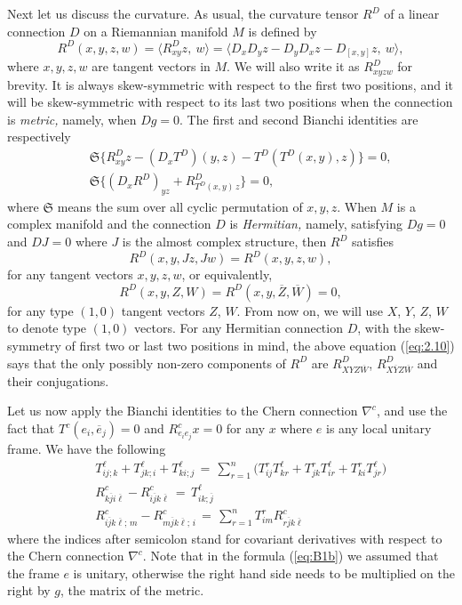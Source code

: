 \documentclass{amsart}
\numberwithin{equation}{section}
\theoremstyle{definition}
\renewcommand{\1}{\mathds{1}}
\renewcommand{\>}{\rightarrow}
\begin{document}
Next let us discuss the curvature. As usual, the curvature tensor $R^D$ of a linear connection $D$ on a Riemannian manifold $M$ is defined  by
$$ R^D(x,y,z,w) = \langle R^D_{xy}z, \ w \rangle = \langle D_xD_yz-D_yD_xz - D_{[x,y]}z, \ w \rangle, $$
where $x,y,z,w$ are tangent vectors in $M$. We will also write it as $R^D_{xyzw}$ for brevity. It is always skew-symmetric with respect to the first two positions, and it will be skew-symmetric with respect to its last two positions when the connection is {\em metric,}  namely, when $Dg=0$.  The first and second Bianchi identities are respectively
\begin{eqnarray*}
&& {\mathfrak S}\{ R^D_{xy}z - (D_xT^D)(y,z) - T^D(T^D(x,y),z)  \} = 0,   \label{eq:B1} \\
&& {\mathfrak S}\{ (D_xR^D)_{yz} + R^D_{T^D(x,y)\, z} \} = 0,  \label{eq:B2}
\end{eqnarray*}
where ${\mathfrak S}$ means the sum over all cyclic permutation of $x,y,z$. When $M$ is a complex manifold and the connection $D$ is {\em Hermitian,} namely, satisfying $Dg=0$ and $DJ=0$ where $J$ is the almost complex structure, then $R^D$ satisfies
$$ R^D(x,y,Jz,Jw) = R^D(x,y,z,w), $$
for any tangent vectors $x,y,z,w$, or equivalently,
\begin{equation}
 R^D(x,y,Z,W) = R^D(x,y,\overline{Z},\overline{W}) =0 , \label{eq:2.10}
 \end{equation}
for any type $(1,0)$ tangent vectors $Z$, $W$. From now on, we will use $X$, $Y$, $Z$, $W$ to denote type $(1,0)$ vectors. For any Hermitian connection $D$, with the skew-symmetry of first two or last two positions in mind, the above equation (\ref{eq:2.10}) says that the only possibly non-zero components of $R^D$ are $R^D_{XYZ\overline{W}}$, $R^D_{X\overline{Y}Z\overline{W}}$ and their conjugations.

Let us now apply the Bianchi identities to the Chern connection $\nabla^c$, and use the fact that $T^c(e_i, \overline{e}_j)=0$ and $R^c_{e_ie_j}x =0$ for any $x$ where $e$ is any local unitary frame. We have the following
\begin{eqnarray}
&&  T^{\ell}_{ij;k} + T^{\ell}_{jk;i}+ T^{\ell}_{ki;j}\, = \,  \sum_{r=1}^n \big( T^r_{ij}T^{\ell}_{kr} + T^r_{jk}T^{\ell}_{ir}+ T^r_{ki}T^{\ell}_{jr}\big)  \label{eq:B1a} \\
&&  R^c_{k\overline{j}i\overline{\ell}} -  R^c_{i\overline{j}k\overline{\ell}} \, = \,  T^{\ell}_{ik;\overline{j}} \label{eq:B1b} \\
&& R^c_{i\overline{j}k\overline{\ell};\, m} - R^c_{m\overline{j}k\overline{\ell}; \,i} \,= \, \sum_{r=1}^n T^{r}_{im} R^c_{r\overline{j}k\overline{\ell}}  \label{eq:B2}
\end{eqnarray}
where the indices after semicolon stand for covariant derivatives with respect to the Chern connection $\nabla^c$. Note that in the formula (\ref{eq:B1b}) we assumed that the frame $e$ is unitary, otherwise the right hand side needs to be multiplied on the right by $g$, the matrix of the metric.
\end{document}
